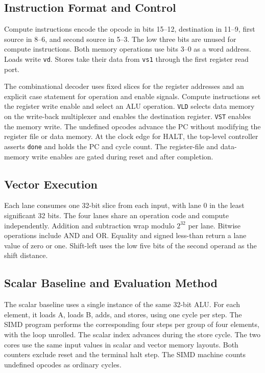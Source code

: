 \documentclass[conference]{IEEEtran}
\begin{document}
\subsection{Instruction Format and Control}
Compute instructions encode the opcode in bits 15--12, destination in
11--9, first source in 8--6, and second source in 5--3. The low three bits
are unused for compute instructions. Both memory operations use bits 3--0
as a word address. Loads write \texttt{vd}. Stores take their data from
\texttt{vs1} through the first register read port.

The combinational decoder uses fixed slices for the register addresses and
an explicit case statement for operation and enable signals. Compute
instructions set the register write enable and select an ALU operation.
\texttt{VLD} selects data memory on the write-back multiplexer and enables
the destination register. \texttt{VST} enables the memory write. The
undefined opcodes advance the PC without modifying the register file or
data memory. At the clock edge for HALT, the top-level controller asserts
\texttt{done} and holds the PC and cycle count. The register-file and
data-memory write enables are gated during reset and after completion.

\subsection{Vector Execution}
Each lane consumes one 32-bit slice from each input, with lane 0 in the
least significant 32 bits. The four lanes share an operation code and
compute independently. Addition and subtraction wrap modulo $2^{32}$ per
lane. Bitwise operations include AND and OR. Equality and signed less-than
return a lane value of zero or one. Shift-left uses the low five bits of
the second operand as the shift distance.

\subsection{Scalar Baseline and Evaluation Method}
The scalar baseline uses a single instance of the same 32-bit ALU. For each
element, it loads A, loads B, adds, and stores, using one cycle per step.
The SIMD program performs the corresponding four steps per group of four
elements, with the loop unrolled. The scalar index advances during the
store cycle. The two cores use the same input values in scalar and vector
memory layouts. Both counters exclude reset and the terminal halt step. The SIMD machine
counts undefined opcodes as ordinary cycles.
\end{document}
